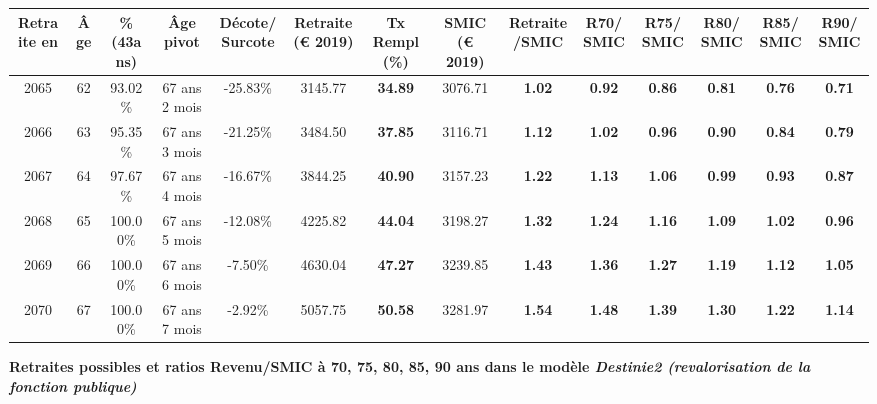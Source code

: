 \begin{adjustbox}{max width=\textwidth} 
\begin{tabular}[htb]{|c|c||c|c|c||c|c||c|c||c|c|c|c|c|} 
\hline 
 Retraite en &  Âge &  \%(43ans) &  Âge pivot &  Décote/Surcote &  Retraite (\euro{} 2019) &  Tx Rempl(\%) &  SMIC (\euro{} 2019) &  Retraite/SMIC &  R70/SMIC &  R75/SMIC &  R80/SMIC &  R85/SMIC &  R90/SMIC \\ 
\hline \hline 
 2065 &  62 &  93.02\% &  67 ans 2 mois &  -25.83\% &  3145.77 &  {\bf 34.89} &  3076.71 &  {\bf 1.02} &  {\bf {\color{red} 0.92}} &  {\bf {\color{red} 0.86}} &  {\bf {\color{red} 0.81}} &  {\bf {\color{red} 0.76}} &  {\bf {\color{red} 0.71}} \\ 
\hline 
 2066 &  63 &  95.35\% &  67 ans 3 mois &  -21.25\% &  3484.50 &  {\bf 37.85} &  3116.71 &  {\bf 1.12} &  {\bf 1.02} &  {\bf {\color{red} 0.96}} &  {\bf {\color{red} 0.90}} &  {\bf {\color{red} 0.84}} &  {\bf {\color{red} 0.79}} \\ 
\hline 
 2067 &  64 &  97.67\% &  67 ans 4 mois &  -16.67\% &  3844.25 &  {\bf 40.90} &  3157.23 &  {\bf 1.22} &  {\bf 1.13} &  {\bf 1.06} &  {\bf {\color{red} 0.99}} &  {\bf {\color{red} 0.93}} &  {\bf {\color{red} 0.87}} \\ 
\hline 
 2068 &  65 &  100.00\% &  67 ans 5 mois &  -12.08\% &  4225.82 &  {\bf 44.04} &  3198.27 &  {\bf 1.32} &  {\bf 1.24} &  {\bf 1.16} &  {\bf 1.09} &  {\bf 1.02} &  {\bf {\color{red} 0.96}} \\ 
\hline 
 2069 &  66 &  100.00\% &  67 ans 6 mois &  -7.50\% &  4630.04 &  {\bf 47.27} &  3239.85 &  {\bf 1.43} &  {\bf 1.36} &  {\bf 1.27} &  {\bf 1.19} &  {\bf 1.12} &  {\bf 1.05} \\ 
\hline 
 2070 &  67 &  100.00\% &  67 ans 7 mois &  -2.92\% &  5057.75 &  {\bf 50.58} &  3281.97 &  {\bf 1.54} &  {\bf 1.48} &  {\bf 1.39} &  {\bf 1.30} &  {\bf 1.22} &  {\bf 1.14} \\ 
\hline 
\hline 
\end{tabular} 
\end{adjustbox} 
 
 \vspace{0.1cm} 
{\bf \noindent Retraites possibles et ratios Revenu/SMIC à 70, 75, 80, 85, 90 ans dans le modèle \emph{Destinie2 (revalorisation de la fonction publique)}}  
 
